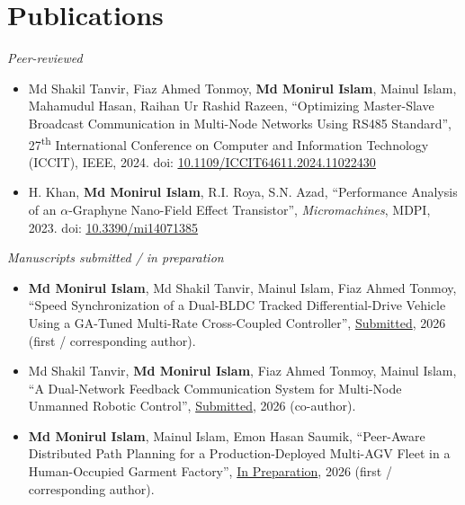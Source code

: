\documentclass[a4paper,20pt]{article}
\begin{document}
\section{\textbf{Publications}}
{\small \textit{Peer-reviewed}}
\begin{itemize}[leftmargin=*]

\item Md Shakil Tanvir, Fiaz Ahmed Tonmoy, \textbf{Md Monirul Islam}, Mainul Islam, Mahamudul Hasan, Raihan Ur Rashid Razeen, ``Optimizing Master-Slave Broadcast Communication in Multi-Node Networks Using RS485 Standard'', 27\textsuperscript{th} International Conference on Computer and Information Technology (ICCIT), IEEE, 2024. doi: \href{https://doi.org/10.1109/ICCIT64611.2024.11022430}{\underline{10.1109/ICCIT64611.2024.11022430}}
\vspace{-1pt}

\item H. Khan, \textbf{Md Monirul Islam}, R.I. Roya, S.N. Azad, ``Performance Analysis of an \(\alpha\)-Graphyne Nano-Field Effect Transistor'', \textit{Micromachines}, MDPI, 2023. doi: \href{https://doi.org/10.3390/mi14071385}{\underline{10.3390/mi14071385}}

\end{itemize}
\vspace{-2pt}
{\small \textit{Manuscripts submitted / in preparation}}
\begin{itemize}[leftmargin=*]

\item \textbf{Md Monirul Islam}, Md Shakil Tanvir, Mainul Islam, Fiaz Ahmed Tonmoy, ``Speed Synchronization of a Dual-BLDC Tracked Differential-Drive Vehicle Using a GA-Tuned Multi-Rate Cross-Coupled Controller'', \underline{Submitted}, 2026 (first / corresponding author).
\vspace{-1pt}

\item Md Shakil Tanvir, \textbf{Md Monirul Islam}, Fiaz Ahmed Tonmoy, Mainul Islam, ``A Dual-Network Feedback Communication System for Multi-Node Unmanned Robotic Control'', \underline{Submitted}, 2026 (co-author).
\vspace{-1pt}

\item \textbf{Md Monirul Islam}, Mainul Islam, Emon Hasan Saumik, ``Peer-Aware Distributed Path Planning for a Production-Deployed Multi-AGV Fleet in a Human-Occupied Garment Factory'', \underline{In Preparation}, 2026 (first / corresponding author).

\end{itemize}
\end{document}
